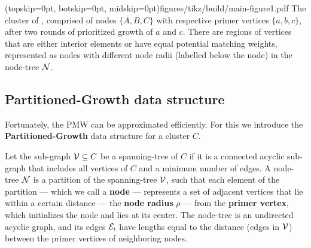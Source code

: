 \Figure[htb](topskip=0pt, botskip=0pt, midskip=0pt){figures/tikz/build/main-figure1.pdf}{
    The cluster of , comprised of nodes $\{A, B, C\}$ with respective primer vertices $\{a, b, c\}$, after two rounds of prioritized growth of $a$ and $c$. There are regions of vertices that are either interior elements or have equal potential matching weights, represented as nodes with different node radii (labelled below the node) in the node-tree $\mathcal{N}$. \label{fig1}}

\subsection{Partitioned-Growth data structure}\label{sec:nodeset}
Fortunately, the PMW can be approximated efficiently. For this we introduce the \textbf{Partitioned-Growth} data structure for a cluster $C$.

Let the sub-graph $\mathcal{V}\subseteq C$ be a spanning-tree of $C$ if it is a connected acyclic sub-graph that includes all vertices of $C$ and a minimum number of edges. A node-tree $\mathcal{N}$ is a partition of the spanning-tree $\mathcal{V}$, such that each element of the partition --- which we call a \textbf{node} --- represents a set of adjacent vertices that lie within a certain distance --- the \textbf{node radius} $\rho$ --- from the \textbf{primer vertex}, which initializes the node and lies at its center. The node-tree is an undirected acyclic graph, and its edges $\mathcal{E}_i$ have lengths equal to the distance (edges in $\mathcal{V}$) between the primer vertices of neighboring nodes. 





